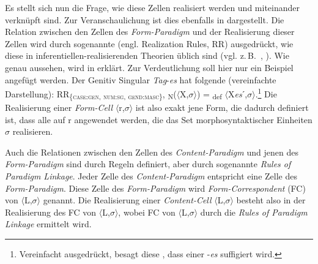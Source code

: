 Es stellt sich nun die Frage, wie diese Zellen realisiert werden und miteinander verknüpft sind. Zur Veranschaulichung ist dies ebenfalls in  dargestellt. Die Relation zwischen den Zellen des \textit{Form-Paradigm} und der Realisierung dieser Zellen wird durch sogenannte  (engl. Realization Rules, RR) ausgedrückt, wie diese in in\-fe\-ren\-tiel\-len-re\-a\-li\-sie\-ren\-den Theorien üblich sind (vgl. z.\,B.\ \citealt{Zwicky1985}, \citealt{Anderson1992}). Wie  genau aussehen, wird in  erklärt. Zur Verdeutlichung soll hier nur ein Beispiel angefügt werden. Der Genitiv Singular \textit{Tag}-\textit{es} hat folgende  (vereinfachte Darstellung): RR\textsubscript{\{\textsc{case:gen}, \textsc{num:sg}, \textsc{gend:masc}\}}, \textsubscript{N}($\langle$X,$\sigma$$\rangle$) = \textsubscript{def} $\langle$X\textit{es}ˊ,$\sigma$$\rangle$.\footnote{Vereinfacht ausgedrückt, besagt diese , dass einer  -\textit{es} suffigiert wird.} Die Realisierung einer \textit{Form-Cell} $\langle$r,$\sigma$$\rangle$ ist also exakt jene Form, die dadurch definiert ist, dass alle  auf r angewendet werden, die das Set morphosyntaktischer Einheiten $\sigma $ realisieren.

Auch die Relationen zwischen den Zellen des \textit{Content-Paradigm} und jenen des \textit{Form-Paradigm} sind durch Regeln definiert, aber durch sogenannte \textit{Rules of Paradigm Linkage}. Jeder Zelle des \textit{Content-Paradigm} entspricht eine Zelle des \textit{Form-Paradigm}. Diese Zelle des \textit{Form-Paradigm} wird \textit{Form-Correspondent} (FC) von $\langle$L,$\sigma$$\rangle$ genannt. Die Realisierung einer \textit{Content-Cell} $\langle$L,$\sigma$$\rangle$ besteht also in der Realisierung des FC von $\langle$L,$\sigma$$\rangle$, wobei FC von $\langle$L,$\sigma$$\rangle$ durch die \textit{Rules of Paradigm Linkage} ermittelt wird.

